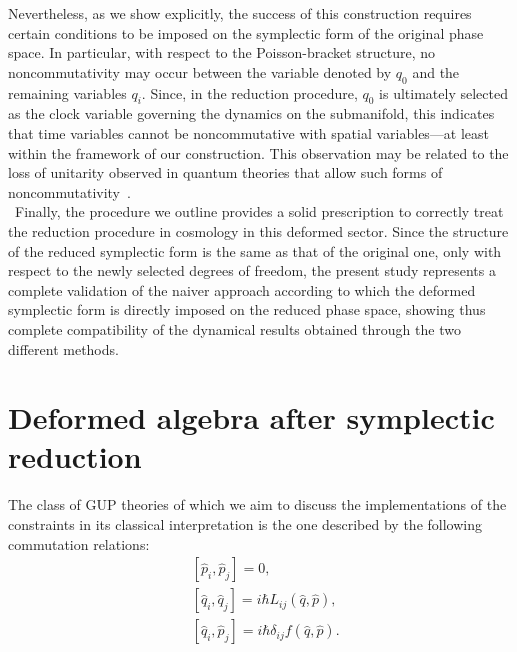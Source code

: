 \documentclass{article}
\numberwithin{equation}{section}
\theoremstyle{definition}
\begin{document}
Nevertheless, as we show explicitly, the success of this construction requires certain conditions to be imposed on the symplectic form of the original phase space. In particular, with respect to the Poisson-bracket structure, no noncommutativity may occur between the variable denoted by $q_0$ and the remaining variables $q_i$. Since, in the reduction procedure, $q_0$ is ultimately selected as the clock variable governing the dynamics on the submanifold, this indicates that time variables cannot be noncommutative with spatial variables—at least within the framework of our construction. This observation may be related to the loss of unitarity observed in quantum theories that allow such forms of noncommutativity~\cite{balachandran2004unitary}.\\\
Finally, the procedure we outline provides a solid prescription to correctly treat the reduction procedure in cosmology in this deformed sector. Since the structure of the reduced symplectic form is the same as that of the original one, only with respect to the newly selected degrees of freedom, the present study represents a complete validation of the naiver approach according to which the deformed symplectic form is directly imposed on the reduced phase space, showing thus complete compatibility of the dynamical results obtained through the two different methods.



\section{Deformed algebra after symplectic reduction} \label{Sec_II}
The class of GUP theories of which we aim to discuss the implementations of the constraints in its classical interpretation is the one described by the following commutation relations:
  \begin{align}
  \label{GUP}
    \nonumber
    &[\hat p_i,\hat p_j]=0,\\
    &[\hat q_i,\hat q_j]=i\hbar L_{ij}(\hat q,\hat p),\\ \nonumber    
    &[\hat q_i,\hat p_j]=i\hbar\delta_{ij} f(\hat q,\hat p).
  \end{align}
  
\end{document}
